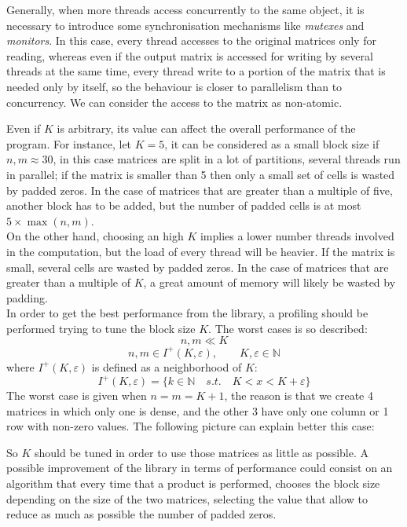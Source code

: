 \documentclass[10pt,a4paper]{article}
\begin{document}
Generally, when more threads access concurrently to the same object, it is necessary
to introduce some synchronisation mechanisms like \textit{mutexes} and 
\textit{monitors}. In this case, every thread accesses to the original matrices
only for reading, whereas even if the output matrix is accessed for writing by several
threads at the same time, every thread write to a portion of the matrix that is
needed only by itself, so the behaviour is closer to parallelism than to concurrency.
We can consider the access to the matrix as non-atomic. 
\par\medskip\noindent
Even if $K$ is arbitrary, its value can affect the overall performance of the
program. For instance, let $K=5$, it can be considered as a small block size if
$n,m\approx 30$, in this case matrices are split in a lot of partitions, several
threads run in parallel; if the matrix is smaller than 5 then only a small set of
cells is wasted by padded zeros. In the case of matrices that are greater than a
multiple of five, another block has to be added, but the number of padded cells is
at most $5\times \max(n,m)$.\\ On the other hand, choosing an high $K$ implies a
lower number threads involved in the computation, but the load of every thread will
be heavier. If the matrix is small, several cells are wasted by padded
zeros. In the case of matrices that are greater than a multiple of $K$, a great amount
of memory will likely be wasted by padding.\\ In order to get the best performance
from the library, a profiling should be performed trying to tune the block size $K$.
The worst cases is so described:
\[
    n,m \ll K    
\]
\[
    n,m\in I^{+}(K,\varepsilon),\qquad K,\varepsilon\in\mathbb{N}
\]
where $I^{+}(K,\varepsilon)$ is defined as a neighborhood of $K$:
\[
    I^{+}(K,\varepsilon)=\{k\in\mathbb{N}\quad \textit{s.t.}\quad K<x<K+\varepsilon\}
\]
The worst case is given when $n = m = K+1$, the reason is that we create 4 matrices in which only one is dense, and the other 3 have only one column or 1 row with non-zero values. The following picture can explain better this case:

\par\medskip\noindent
So $K$ should be tuned in order to use those matrices as little as possible. A possible
improvement of the library in terms of performance could consist on an algorithm that
every time that a product is performed, chooses the block size depending on the size of
the two matrices, selecting the value that allow to reduce as much as possible the
number of padded zeros.
\end{document}
